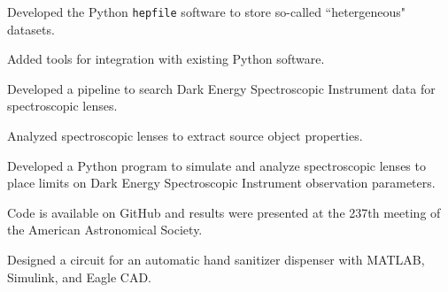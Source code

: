 \documentclass[a4paper, 12pt]{article}
\begin{document}
\begin{zitemize}
    \item Developed the Python \texttt{hepfile} software to store so-called ``hetergeneous" datasets.
    \item Added tools for integration with existing Python software.
\end{zitemize}
\vspace*{5pt}

\begin{zitemize}
    \item Developed a pipeline to search Dark Energy Spectroscopic Instrument data for spectroscopic lenses.
    \item Analyzed spectroscopic lenses to extract source object properties.
\end{zitemize}
\vspace*{5pt}

\begin{zitemize}
    \item Developed a Python program to simulate and analyze spectroscopic lenses to place limits on Dark Energy Spectroscopic Instrument observation parameters.
    \item Code is available on GitHub and results were presented at the 237th meeting of the American Astronomical Society.
\end{zitemize}
\vspace*{5pt}

\begin{zitemize}
    \item Designed a circuit for an automatic hand sanitizer dispenser with MATLAB, Simulink, and Eagle CAD.
\end{zitemize}
\end{document}
